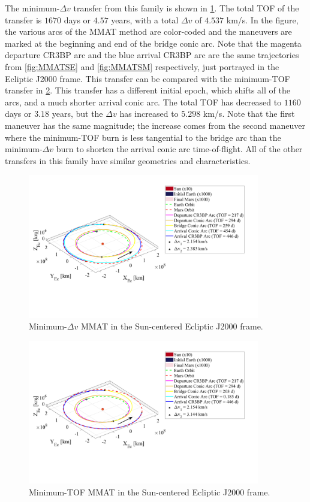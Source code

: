 The minimum-$\Delta v$ transfer from this family is shown in \cref{fig:MMATDv}. The total TOF of
the transfer is $1670$ days or $4.57$ years, with a total $\Delta v$ of $4.537$ km/s. In the
figure, the various arcs of the MMAT method are color-coded and the maneuvers are marked at the
beginning and end of the bridge conic arc. Note that the magenta departure CR3BP arc and the blue
arrival CR3BP arc are the same trajectories from \cref{fig:MMATSE} and \cref{fig:MMATSM}
respectively, just portrayed in the Ecliptic J2000 frame. This transfer can be compared with the
minimum-TOF transfer in \cref{fig:MMATTOF}. This transfer has a different initial epoch, which
shifts all of the arcs, and a much shorter arrival conic arc. The total TOF has decreased to $1160$
days or $3.18$ years, but the $\Delta v$ has increased to $5.298$ km/s. Note that the first
maneuver has the same magnitude; the increase comes from the second maneuver where the minimum-TOF
burn is less tangential to the bridge arc than the minimum-$\Delta v$ burn to shorten the arrival
conic arc time-of-flight. All of the other transfers in this family have similar geometries and
characteristics.

\begin{figure}[ht]
    \centering
    \includegraphics[width=0.9\textwidth]{figures/MinDvMMAT.pdf}
    \caption{Minimum-$\Delta v$ MMAT in the Sun-centered Ecliptic J2000 frame.}
    \label{fig:MMATDv}
\end{figure}

\begin{figure}[ht]
    \centering
    \includegraphics[width=0.9\textwidth]{figures/MinTOFMMAT.pdf}
    \caption{Minimum-TOF MMAT in the Sun-centered Ecliptic J2000 frame.}
    \label{fig:MMATTOF}
\end{figure}
